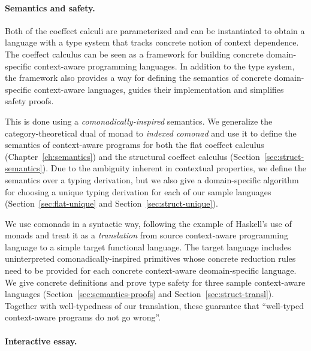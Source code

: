 
\paragraph{Semantics and safety.}

Both of the coeffect calculi are parameterized and can be instantiated to obtain a language with
a type system that tracks concrete notion of context dependence. The coeffect calculus can be seen
as a framework for building concrete domain-specific context-aware programming languages. In
addition to the type system, the framework also provides a way for defining the semantics of
concrete domain-specific context-aware languages, guides their implementation and simplifies
safety proofs.

This is done using a \emph{comonadically-inspired} semantics. We generalize the category-theoretical
dual of monad to \emph{indexed comonad} and use it to define the semantics of context-aware
programs for both the flat coeffect calculus (Chapter~\ref{ch:semantics}) and the structural coeffect
calculus (Section~\ref{sec:struct-semantics}). Due to the ambiguity inherent in contextual properties,
we define the semantics over a typing derivation, but we also give a domain-specific algorithm for
choosing a unique typing derivation for each of our sample languages (Section~\ref{sec:flat-unique}
and Section~\ref{sec:struct-unique}).

We use comonads in a syntactic way, following the example of Haskell's use of monads and treat
it as a \emph{translation} from source context-aware programming language to a simple target
functional language. The target language includes uninterpreted comonadically-inspired primitives
whose concrete reduction rules need to be provided for each concrete context-aware deomain-specific
language. We give concrete definitions and prove type safety for three sample context-aware
languages (Section~\ref{sec:semantics-proofs} and Section~\ref{sec:struct-transl}). Together with
well-typedness of our translation, these guarantee that ``well-typed context-aware programs do
not go wrong''.


\paragraph{Interactive essay.}

